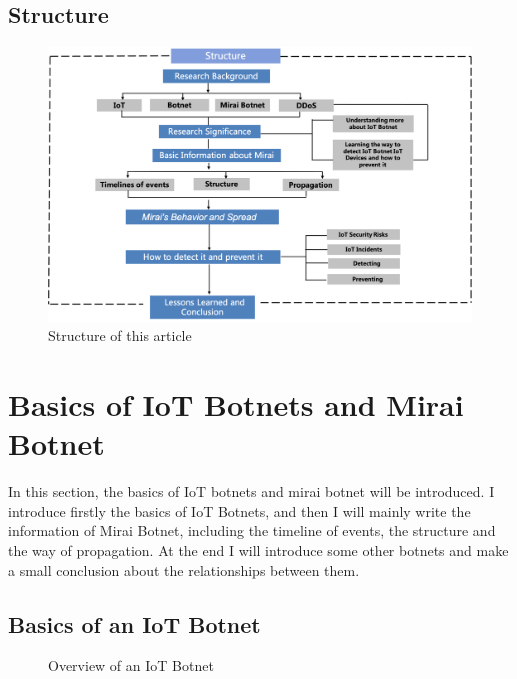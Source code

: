 \documentclass[conference]{IEEEtran}
\begin{document}
\subsection{\textbf{Structure}}
\begin{figure}[htbp]
\centerline{\includegraphics[scale=0.30]{structure.png}}
\caption{Structure of this article}
\label{fig}
\end{figure}


\section{\textbf{Basics of IoT Botnets and Mirai Botnet}}
In this section, the basics of IoT botnets and mirai botnet will be introduced. I introduce firstly the basics of IoT Botnets, and then I will mainly write the information of Mirai Botnet, including the timeline of events, the structure and the way of propagation. At the end I will introduce some other botnets and make a small conclusion about the relationships between them.
\subsection{\textbf{Basics of an IoT Botnet}}
\begin{figure}[htbp]
\caption{Overview of an IoT Botnet\cite{b3}}
\label{fig}
\end{figure}
\end{document}
